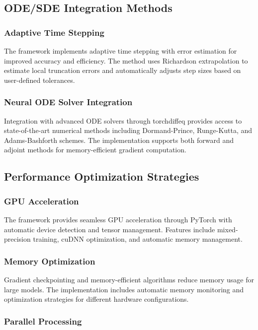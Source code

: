 \subsection{ODE/SDE Integration Methods}

\subsubsection{Adaptive Time Stepping}

The framework implements adaptive time stepping with error estimation for improved accuracy and efficiency. The method uses Richardson extrapolation to estimate local truncation errors and automatically adjusts step sizes based on user-defined tolerances.

\subsubsection{Neural ODE Solver Integration}

Integration with advanced ODE solvers through torchdiffeq provides access to state-of-the-art numerical methods including Dormand-Prince, Runge-Kutta, and Adams-Bashforth schemes. The implementation supports both forward and adjoint methods for memory-efficient gradient computation.

\subsection{Performance Optimization Strategies}

\subsubsection{GPU Acceleration}

The framework provides seamless GPU acceleration through PyTorch with automatic device detection and tensor management. Features include mixed-precision training, cuDNN optimization, and automatic memory management.

\subsubsection{Memory Optimization}

Gradient checkpointing and memory-efficient algorithms reduce memory usage for large models. The implementation includes automatic memory monitoring and optimization strategies for different hardware configurations.

\subsubsection{Parallel Processing}

